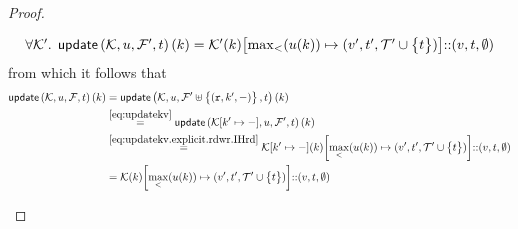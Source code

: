 \begin{proof}
\begin{enumerate}
\begin{itemize}
\begin{equation}
			\label{eq:updatekv.explicit.rdwr.IHrd}
            \begin{array}{l}
            \fora{\mkvs'}\updateKV[\mkvs,\vi,\fp',\txid](\key) = 
            \mkvs'(\key)\rmto{\max_{<}(\vi(\key))}{(\val', \txid', \txidset' \cup \Set{\txid})} \lcat (\val, \txid, \emptyset)
            \end{array}
			\end{equation}
			from which it follows that 
            \begin{align*}
			    \updateKV[\mkvs, \vi, \fp,\txid](\key)
                & = 
                \updateKV[\mkvs, \vi, \fp' \uplus \Set{(\otR, \key', \stub)}, \txid](\key) \\
                & \stackrel{\cref{eq:updatekv}}{=}
			    \updateKV[\mkvs\rmto{\key'}{\stub}, \vi, \fp', \txid](\key) \\
                & \stackrel{\cref{eq:updatekv.explicit.rdwr.IHrd}}{=} 
                \mkvs\rmto{\key'}{\stub}(\key)\rmto{\max_{<}(\vi(\key))}{(\val', \txid', \txidset' \cup \Set{\txid})} \lcat (\val, \txid, \emptyset) \\
                & = 
                \mkvs(\key)\rmto{\max_{<}(\vi(\key))}{(\val', \txid', \txidset' \cup \Set{\txid})} \lcat (\val, \txid, \emptyset)
            \end{align*}
			

\end{itemize}
\end{enumerate}
\end{proof}
